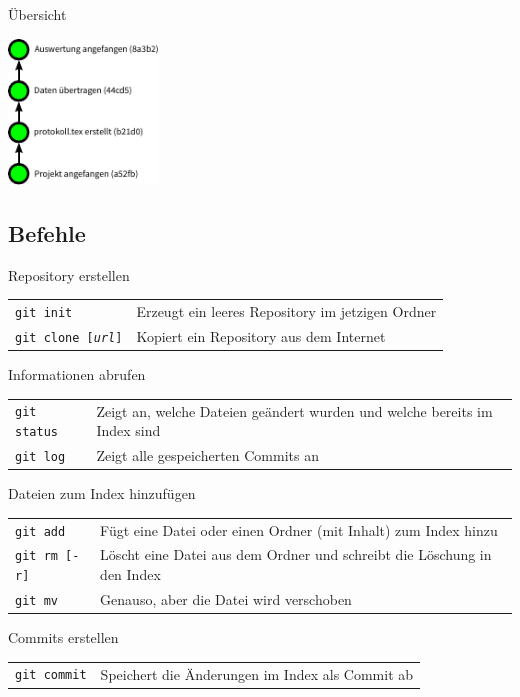 \begin{frame}{Übersicht}
  \begin{center}
    \includegraphics[width=150px]{../Notes/img/commits.pdf}
  \end{center}
\end{frame}

\subsection{Befehle}
\begin{frame}{Repository erstellen}
  \begin{tabular}{lp{20em}}
    \texttt{git init} & Erzeugt ein leeres Repository im jetzigen Ordner \\
    \texttt{git clone [\textit{url}]} & Kopiert ein Repository aus dem Internet
  \end{tabular}
\end{frame}

\begin{frame}{Informationen abrufen}
  \begin{tabular}{lp{20em}}
    \texttt{git status} & Zeigt an, welche Dateien geändert wurden und welche bereits im Index sind \\
    \texttt{git log}    & Zeigt alle gespeicherten Commits an
  \end{tabular}
\end{frame}

\begin{frame}{Dateien zum Index hinzufügen}
  \begin{tabular}{lp{20em}}
    \texttt{git add} & Fügt eine Datei oder einen Ordner (mit Inhalt) zum Index hinzu \\
    \texttt{git rm [-r]}  & Löscht eine Datei aus dem Ordner und schreibt die Löschung in den Index  \\
    \texttt{git mv}  & Genauso, aber die Datei wird verschoben
  \end{tabular}
\end{frame}

\begin{frame}{Commits erstellen}
  \begin{tabular}{lp{20em}}
    \texttt{git commit} & Speichert die Änderungen im Index als Commit ab
  \end{tabular}
\end{frame}

